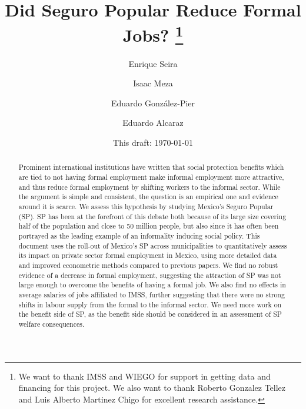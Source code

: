 \documentclass[oneside,11pt]{article}
\begin{document}
\title{Did Seguro Popular Reduce Formal Jobs?  \thanks{We want to thank IMSS and WIEGO for support in getting data and financing for this project. We also want to thank Roberto Gonzalez Tellez and Luis Alberto Martinez Chigo  for excellent research assistance.}}
\author{Enrique Seira  \and Isaac Meza  \and Eduardo González-Pier \and Eduardo Alcaraz %
}
\date{This draft:  \today \\[2 cm]}



\maketitle
\thispagestyle{empty}
\begin{abstract}

Prominent international institutions have written that social protection benefits which are tied to not having formal employment make informal employment more attractive, and thus reduce formal employment by shifting workers to the informal sector. While the argument is simple and consistent, the question is an empirical one and evidence around it is scarce. We assess this hypothesis by studying Mexico's Seguro Popular (SP). SP has been at the forefront of this debate both because of its large size covering half of the population and close to 50 million people, but also since it has often been portrayed as the leading example of an informality inducing social policy. This document uses the roll-out of Mexico's SP across municipalities to quantitatively assess its impact on private sector formal employment in Mexico, using more detailed data and improved econometric methods compared to previous papers. We find no robust evidence of a decrease in formal employment, suggesting the attraction of SP was not large enough to overcome the benefits of having a formal job. We also find no effects in average salaries of jobs affiliated to IMSS, further suggesting that there were no strong shifts in labour supply from the formal to the informal sector. We need more work on the benefit side of SP, as the benefit side should be considered in an assessment of SP welfare consequences.


\end{abstract}

\vspace{.3in}
\end{document}
